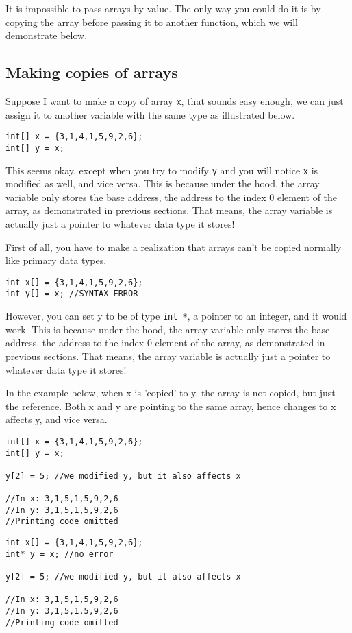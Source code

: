 It is impossible to pass arrays by value. The only way you could do it is by copying the array before passing it to another function, which we will demonstrate below.

\subsection{Making copies of arrays}

\if{}
Suppose I want to make a copy of array \texttt{x}, that sounds easy enough, we can just assign it to another variable with the same type as illustrated below. 

\begin{lstlisting}
int[] x = {3,1,4,1,5,9,2,6};
int[] y = x; 
\end{lstlisting}

This seems okay, except when you try to modify \texttt{y} and you will notice \texttt{x} is modified as well, and vice versa. This is because under the hood, the array variable only stores the base address, the address to the index 0 element of the array, as demonstrated in previous sections. That means, the array variable is actually just a pointer to whatever data type it stores! 

\else

First of all, you have to make a realization that arrays can't be copied normally like primary data types.

\begin{lstlisting}
int x[] = {3,1,4,1,5,9,2,6};
int y[] = x; //SYNTAX ERROR
\end{lstlisting}

However, you can set y to be of type \texttt{int *}, a pointer to an integer, and it would work. This is because under the hood, the array variable only stores the base address, the address to the index 0 element of the array, as demonstrated in previous sections. That means, the array variable is actually just a pointer to whatever data type it stores! 
\fi

In the example below, when x is 'copied' to y, the array is not copied, but just the reference. Both x and y are pointing to the same array, hence changes to x affects y, and vice versa. 

\if{}
\begin{lstlisting}
int[] x = {3,1,4,1,5,9,2,6};
int[] y = x;

y[2] = 5; //we modified y, but it also affects x

//In x: 3,1,5,1,5,9,2,6 
//In y: 3,1,5,1,5,9,2,6 
//Printing code omitted
\end{lstlisting}
\else
\begin{lstlisting}
int x[] = {3,1,4,1,5,9,2,6};
int* y = x; //no error

y[2] = 5; //we modified y, but it also affects x

//In x: 3,1,5,1,5,9,2,6 
//In y: 3,1,5,1,5,9,2,6 
//Printing code omitted
\end{lstlisting}
\fi

